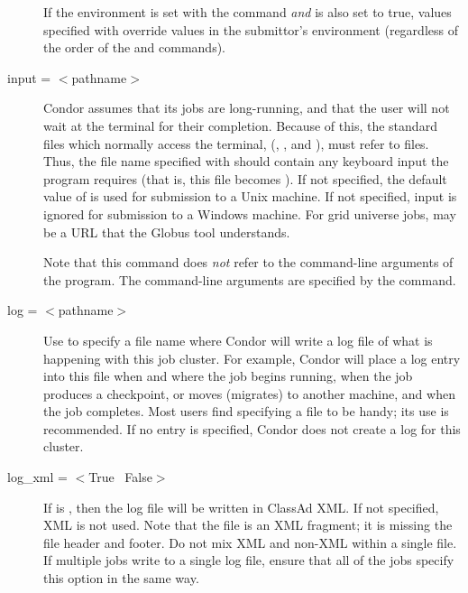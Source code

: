 \begin{description}
If the environment is set with the  command \emph{and}
 is also set to true, values specified with
 override values in the submittor's environment
(regardless of the order of the  and 
commands).



\item[input = $<$pathname$>$]
Condor assumes that its jobs are
long-running, and that the user will not wait at the terminal for their
completion. Because of this, the standard files which normally access
the terminal, (, , and ),
must refer to files. Thus,
the file name specified with  should contain any keyboard
input the program requires (that is, this file becomes ).
If not specified, the default value
of  is used for submission to a Unix machine.
If not specified, input is ignored
for submission to a Windows machine.
For grid universe jobs,  may be a URL that the Globus
tool  understands.

Note that this command does \emph{not} refer to the command-line
arguments of the program.  The command-line arguments are specified by
the  command.


\item[log = $<$pathname$>$] Use  to specify a file name where
Condor will write a log file of what is happening with this job cluster.
For example, Condor will place a log entry into this file
when and where the job begins running,
when the job produces a checkpoint, or moves (migrates) to another machine,
and when the job completes.
Most users find specifying a  file to be handy;
its use is recommended. If no  entry is specified, 
Condor does not create a log for this cluster.


\item[log\_xml = $<$True \Bar\ False$>$]
If  is , 
then the log file will be written in ClassAd XML.
If not specified, XML is not used.
Note that the file is an XML fragment; it is
missing the file header and footer.
Do not mix XML and non-XML within a single file.
If multiple jobs write to a
single log file, ensure that all of the jobs specify
this option in the same way.


\end{description}
